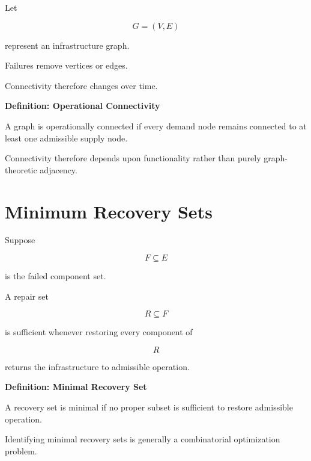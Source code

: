 \documentclass[11pt,fleqn]{book}
\numberwithin{equation}{chapter}
\newenvironment{definition}[1]
  {\begin{definitionEnv}
   \noindent\textbf{Definition: #1}\par\smallskip}
  {\end{definitionEnv}}
\theoremstyle{plain}
\theoremstyle{definition}
\theoremstyle{remark}
\begin{document}
Let

\[
G=(V,E)
\]

represent an infrastructure graph.

Failures remove vertices or edges.

Connectivity therefore changes over time.


\begin{definition}{Operational Connectivity}

A graph is operationally connected if every demand node remains connected
to at least one admissible supply node.

\end{definition}


Connectivity therefore depends upon functionality rather than purely
graph-theoretic adjacency.


\section{Minimum Recovery Sets}

Suppose

\[
F
\subseteq
E
\]

is the failed component set.

A repair set

\[
R
\subseteq
F
\]

is sufficient whenever restoring every component of

\[
R
\]

returns the infrastructure to admissible operation.


\begin{definition}{Minimal Recovery Set}

A recovery set is minimal if no proper subset is sufficient to restore
admissible operation.

\end{definition}


Identifying minimal recovery sets is generally a combinatorial
optimization problem.
\end{document}
